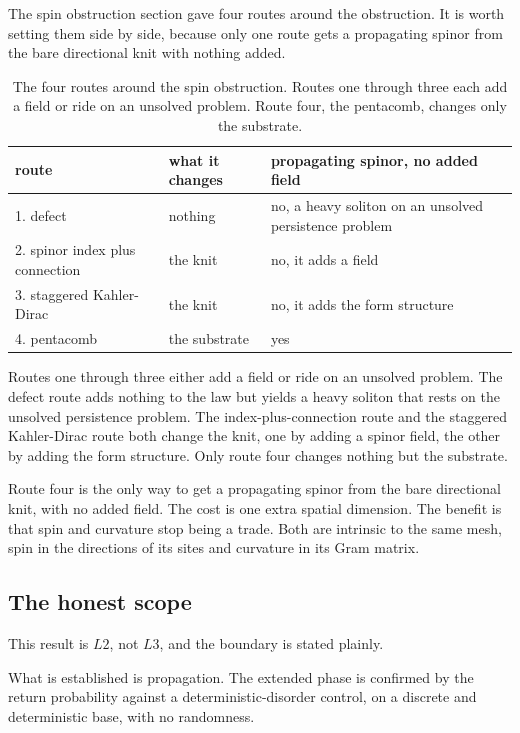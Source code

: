 The spin obstruction section gave four routes around the obstruction. It is worth
setting them side by side, because only one route gets a propagating spinor from the
bare directional knit with nothing added.

\begin{table}[ht]
\centering
\begin{tabular}{@{}lll@{}}
\toprule
route & what it changes & propagating spinor, no added field \\
\midrule
1. defect & nothing & no, a heavy soliton on an unsolved persistence problem \\
2. spinor index plus connection & the knit & no, it adds a field \\
3. staggered Kahler-Dirac & the knit & no, it adds the form structure \\
4. pentacomb & the substrate & yes \\
\bottomrule
\end{tabular}
\caption{The four routes around the spin obstruction. Routes one through three each
add a field or ride on an unsolved problem. Route four, the pentacomb, changes only
the substrate.}
\label{tab:pentacomb-routes}
\end{table}

Routes one through three either add a field or ride on an unsolved problem. The
defect route adds nothing to the law but yields a heavy soliton that rests on the
unsolved persistence problem. The index-plus-connection route and the staggered
Kahler-Dirac route both change the knit, one by adding a spinor field, the other by
adding the form structure. Only route four changes nothing but the substrate.

\begin{result}
Route four is the only way to get a propagating spinor from the bare directional
knit, with no added field. The cost is one extra spatial dimension. The benefit is
that spin and curvature stop being a trade. Both are intrinsic to the same mesh, spin
in the directions of its sites and curvature in its Gram matrix.
\end{result}

\subsection{The honest scope}

This result is $L2$, not $L3$, and the boundary is stated plainly.

What is established is propagation. The extended phase is confirmed by the return
probability against a deterministic-disorder control, on a discrete and deterministic
base, with no randomness.

